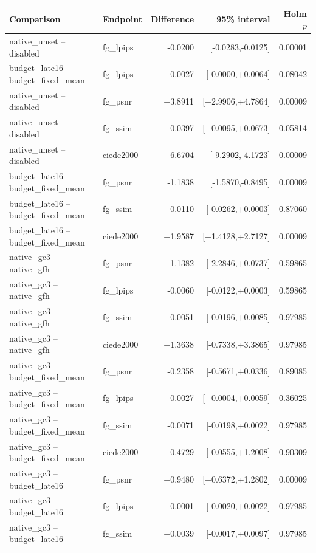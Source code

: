 \documentclass[11pt]{article}
\begin{document}
\begin{center}\scriptsize

\begin{tabular}{llrrr}
\toprule
Comparison & Endpoint & Difference & 95\% interval & Holm $p$ \\
\midrule
native\_unset -- disabled & fg\_lpips & -0.0200 & [-0.0283,-0.0125] & 0.00001 \\
budget\_late16 -- budget\_fixed\_mean & fg\_lpips & +0.0027 & [-0.0000,+0.0064] & 0.08042 \\
native\_unset -- disabled & fg\_psnr & +3.8911 & [+2.9906,+4.7864] & 0.00009 \\
native\_unset -- disabled & fg\_ssim & +0.0397 & [+0.0095,+0.0673] & 0.05814 \\
native\_unset -- disabled & ciede2000 & -6.6704 & [-9.2902,-4.1723] & 0.00009 \\
budget\_late16 -- budget\_fixed\_mean & fg\_psnr & -1.1838 & [-1.5870,-0.8495] & 0.00009 \\
budget\_late16 -- budget\_fixed\_mean & fg\_ssim & -0.0110 & [-0.0262,+0.0003] & 0.87060 \\
budget\_late16 -- budget\_fixed\_mean & ciede2000 & +1.9587 & [+1.4128,+2.7127] & 0.00009 \\
native\_gc3 -- native\_gfh & fg\_psnr & -1.1382 & [-2.2846,+0.0737] & 0.59865 \\
native\_gc3 -- native\_gfh & fg\_lpips & -0.0060 & [-0.0122,+0.0003] & 0.59865 \\
native\_gc3 -- native\_gfh & fg\_ssim & -0.0051 & [-0.0196,+0.0085] & 0.97985 \\
native\_gc3 -- native\_gfh & ciede2000 & +1.3638 & [-0.7338,+3.3865] & 0.97985 \\
native\_gc3 -- budget\_fixed\_mean & fg\_psnr & -0.2358 & [-0.5671,+0.0336] & 0.89085 \\
native\_gc3 -- budget\_fixed\_mean & fg\_lpips & +0.0027 & [+0.0004,+0.0059] & 0.36025 \\
native\_gc3 -- budget\_fixed\_mean & fg\_ssim & -0.0071 & [-0.0198,+0.0022] & 0.97985 \\
native\_gc3 -- budget\_fixed\_mean & ciede2000 & +0.4729 & [-0.0555,+1.2008] & 0.90309 \\
native\_gc3 -- budget\_late16 & fg\_psnr & +0.9480 & [+0.6372,+1.2802] & 0.00009 \\
native\_gc3 -- budget\_late16 & fg\_lpips & +0.0001 & [-0.0020,+0.0022] & 0.97985 \\
native\_gc3 -- budget\_late16 & fg\_ssim & +0.0039 & [-0.0017,+0.0097] & 0.97985 \\

\end{tabular}
\end{center}
\end{document}
